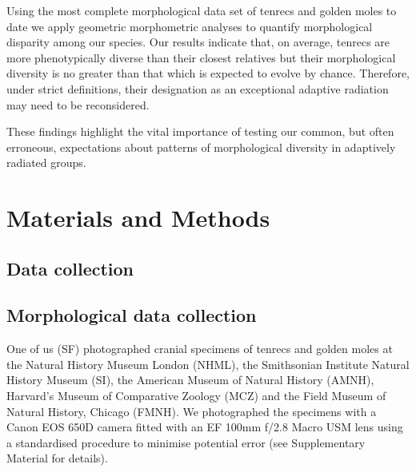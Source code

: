 \documentclass[12pt,a4paper]{article}
\begin{document}
Using the most complete morphological data set of tenrecs and golden moles to date  we apply geometric morphometric analyses \citep{Rohlf1993, Zelditch2012} to quantify morphological disparity among our species. Our results indicate that, on average, tenrecs are more phenotypically diverse than their closest relatives but their morphological diversity is no greater than that which is expected to evolve by chance. Therefore, under strict definitions, their designation as an exceptional adaptive radiation may need to be reconsidered. 

These findings highlight the vital importance of testing our common, but often erroneous, expectations about patterns of morphological diversity in adaptively radiated groups. 


\section{Materials and Methods}

\subsection{Data collection} %

\subsection{Morphological data collection} %

	
One of us (SF) photographed cranial specimens of tenrecs and golden moles at the Natural History Museum London (NHML), the Smithsonian Institute Natural History Museum (SI), the American Museum of Natural History (AMNH), Harvard's Museum of Comparative Zoology (MCZ) and the Field Museum of Natural History, Chicago (FMNH). We photographed the specimens with a Canon EOS 650D camera fitted with an EF 100mm f/2.8 Macro USM lens using a standardised procedure to minimise potential error (see Supplementary Material for details). 
\end{document}
